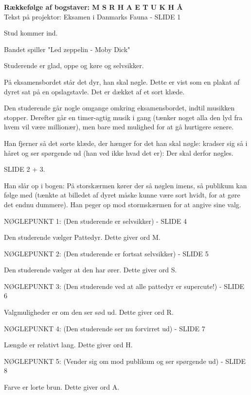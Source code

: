 \documentclass[a4paper,12pt]{article}
\begin{document}
\begin{sketch}

\textbf{Rækkefølge af bogstaver: M S R H A E T U K H Å}
\\

Tekst på projektor: Eksamen i Danmarks Fauna - SLIDE 1

\scene Stud kommer ind.

Bandet spiller "Led zeppelin - Moby Dick"

\scene Studerende er glad, oppe og køre og selvsikker. 

\scene På eksamensbordet står det dyr, han skal nøgle. Dette er vist som en plakat af dyret sat på en opslagstavle. Det er dækket af et sort klæde.


\scene Den studerende går nogle omgange omkring eksamensbordet, indtil musikken stopper. Derefter går en timer-agtig musik i gang (tænker noget alla den lyd fra hvem vil være millionær), men bare med mulighed for at gå hurtigere senere.

 Han fjerner så det sorte klæde, der hænger for det han skal nøgle: kradser sig så i håret og ser spørgende ud (han ved ikke hvad det er): Der skal derfor nøgles.
 
SLIDE 2 + 3.

\scene Han slår op i bogen: På storskærmen kører der så nøglen imens, så publikum kan følge med (tænkte at billedet af dyret måske kunne være sort hvidt, for at gøre det endnu dummere). Han peger op mod stormskærmen for at angive sine valg. 

NØGLEPUNKT 1: (Den studerende er selvsikker) - SLIDE 4

\scene Den studerende vælger Pattedyr. Dette giver ord M.

NØGLEPUNKT 2: (Den studerende er fortsat selvsikker) - SLIDE 5

\scene Den studerende vælger at den har ører. Dette giver ord S.

NØGLEPUNKT 3: (Den studerende ved at alle pattedyr er supercute!) - SLIDE 6

\scene Valgmuligheder er om den ser sød ud. Dette giver ord R.

NØGLEPUNKT 4: (Den studerende ser nu forvirret ud) - SLIDE 7

\scene Længde er relativt lang. Dette giver ord H.

NØGLEPUNKT 5: (Vender sig om mod publikum og ser spørgende ud) - SLIDE 8

Farve er lorte brun. Dette giver ord A.


\end{sketch}
\end{document}
